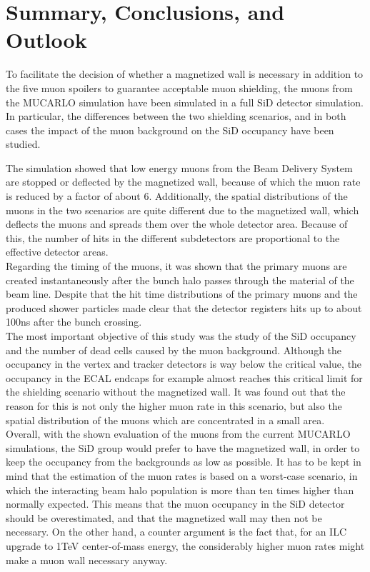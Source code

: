 \section{Summary, Conclusions, and Outlook}

To facilitate the decision of whether a magnetized wall is necessary in addition to the five muon spoilers to guarantee acceptable muon shielding, the muons from the MUCARLO simulation have been simulated in a full SiD detector simulation.
In particular, the differences between the two shielding scenarios, and in both cases the impact of the muon background on the SiD occupancy have been studied.

The simulation showed that low energy muons from the Beam Delivery System are stopped or deflected by the magnetized wall, because of which the muon rate is reduced by a factor of about 6.
Additionally, the spatial distributions of the muons in the two scenarios are quite different due to the magnetized wall, which deflects the muons and spreads them over the whole detector area.
Because of this, the number of hits in the different subdetectors are proportional to the effective detector areas.\\
Regarding the timing of the muons, it was shown that the primary muons are created instantaneously after the bunch halo passes through the material of the beam line.
Despite that the hit time distributions of the primary muons and the produced shower particles made clear that the detector registers hits up to about \unit{100}{ns} after the bunch crossing.\\
The most important objective of this study was the study of the SiD occupancy and the number of dead cells caused by the muon background.
Although the occupancy in the vertex and tracker detectors is way below the critical value, the occupancy in the ECAL endcaps for example almost reaches this critical limit for the shielding scenario without the magnetized wall.
It was found out that the reason for this is not only the higher muon rate in this scenario, but also the spatial distribution of the muons which are concentrated in a small area.\\
Overall, with the shown evaluation of the muons from the current MUCARLO simulations, the SiD group would prefer to have the magnetized wall, in order to keep the occupancy from the backgrounds as low as possible.
It has to be kept in mind that the estimation of the muon rates is based on a worst-case scenario, in which the interacting beam halo population is more than ten times higher than normally expected.
This means that the muon occupancy in the SiD detector should be overestimated, and that the magnetized wall may then not be necessary.
On the other hand, a counter argument is the fact that, for an ILC upgrade to \unit{1}{TeV} center-of-mass energy, the considerably higher muon rates might make a muon wall necessary anyway.

